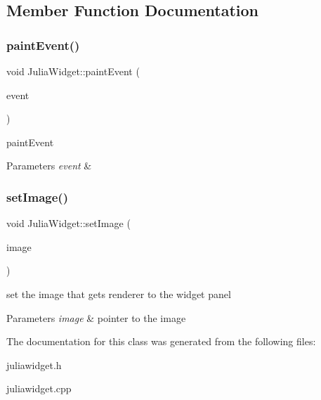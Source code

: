 \subsection{Member Function Documentation}
\mbox{\label{classJuliaWidget_a65d06d3f69873f573380fde577abfcf2}} 
\subsubsection{\texorpdfstring{paint\+Event()}{paintEvent()}}
{\footnotesize\ttfamily void Julia\+Widget\+::paint\+Event (\begin{DoxyParamCaption}\item[{Q\+Paint\+Event $\ast$}]{event }\end{DoxyParamCaption})\hspace{0.3cm}{\ttfamily [protected]}}



paint\+Event 


\begin{DoxyParams}{Parameters}
{\em event} & \\
\hline
\end{DoxyParams}
\mbox{\label{classJuliaWidget_a686d58acadb8eaa396ca6904318a5547}} 
\subsubsection{\texorpdfstring{set\+Image()}{setImage()}}
{\footnotesize\ttfamily void Julia\+Widget\+::set\+Image (\begin{DoxyParamCaption}\item[{Q\+Image $\ast$}]{image }\end{DoxyParamCaption})}

set the image that gets renderer to the widget panel 
\begin{DoxyParams}{Parameters}
{\em image} & pointer to the image \\
\hline
\end{DoxyParams}


The documentation for this class was generated from the following files\+:\begin{DoxyCompactItemize}
\item 
juliawidget.\+h\item 
juliawidget.\+cpp\end{DoxyCompactItemize}

